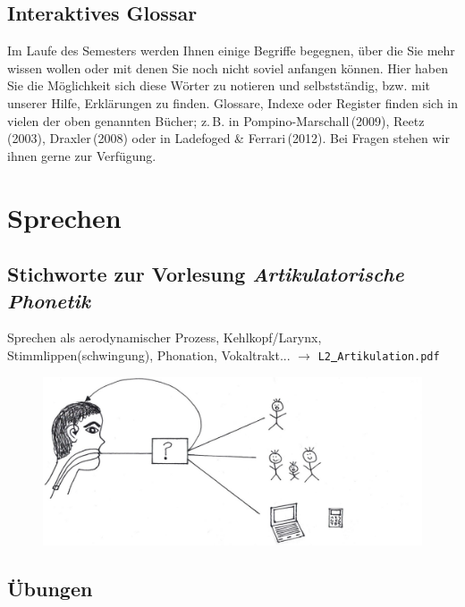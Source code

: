 \documentclass[11pt]{book}
\begin{document}
\section{Interaktives Glossar}

Im Laufe des Semesters werden Ihnen einige Begriffe begegnen, über die Sie mehr wissen wollen oder mit denen Sie noch nicht soviel anfangen können. Hier haben Sie die Möglichkeit sich diese Wörter zu notieren und selbstständig, bzw. mit unserer Hilfe, Erklärungen zu finden. Glossare, Indexe oder Register finden sich in vielen der oben genannten Bücher; z.\,B. in Pompino-Marschall\,(2009), Reetz\,(2003), Draxler\,(2008) oder in Ladefoged \& Ferrari\,(2012). Bei Fragen stehen wir ihnen gerne zur Verfügung.  





\chapter{Sprechen}

\section{Stichworte zur Vorlesung \em{Artikulatorische Phonetik}} 

Sprechen als aerodynamischer Prozess, Kehlkopf/Larynx, Stimmlippen(schwingung), Phonation, Vokaltrakt... $\rightarrow$ {\tt L2\underline{\ }Artikulation.pdf}

\begin{figure}[htbp]
\begin{center}
\includegraphics[width=\textwidth]{grafiken/sprechen/sprechen}
\label{t1}
\end{center}
\end{figure}



\section{Übungen}
\end{document}
